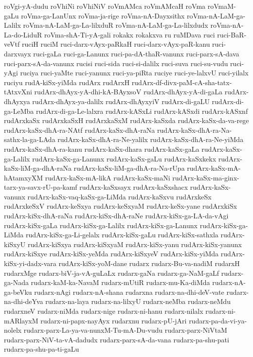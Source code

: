 {roVgi-yA-dudu
roVhiNi
roVhiNiV
roVmAMca
roVmAMcaH
roVma
roVmaM-gaLu
roVma-ga-LanUnx
roVma-ja-rige
roVma-nA-Dayxsithx
roVma-nA-LaM-ga-Lalilx
roVma-nA-LaM-ga-La-lilxduR
roVma-nA-LaM-ga-La-lilxdudx
roVma-nA-La-do-LiduR
roVma-shA-Ti-yA-gali
rokakx
rokakxva
ru
ruMDava
ruci
ruci-BaR-veVtf
ruciH
ruciM
ruci-darx-vAyx-paRkaH
ruci-darx-vAyx-paR-kanu
ruci-darxvayx
ruci-gaLa
ruci-ga-Lanunx
ruci-pa-dA-thaR-vanunx
ruci-parx-sA-dava
ruci-parx-sA-da-vanunx
rucisi
ruci-sida
ruci-si-dalilx
ruci-suva
ruci-su-vudu
ruci-yAgi
ruciya
ruci-yaMte
ruci-yanunx
ruci-ya-piRta
ruciye
ruci-ye-lalxvU
ruci-yilalx
ruciyu
rudA-kiSx-yiMda
rudArx
rudArxH
rudArx-df-divx-paM-cA-sha-tatx-tAtxvXni
rudArx-dhAyx-yA-dhi-kA-BAyxsoV
rudArx-dhAyx-yA-di-gaLa
rudArx-dhAyxya
rudArx-dhAyx-ya-dalilx
rudArx-dhAyxyiV
rudArx-di-gaLU
rudArx-di-ga-LeMba
rudArx-di-ga-Le-lalxra
rudArx-kASxLi
rudArx-kASxdi
rudArx-kASxnf
rudArxkaSx
rudArxkaSxH
rudArxkaSxM
rudArx-kaSxda
rudArx-kaSx-da-va-rege
rudArx-kaSx-dhA-ra-NAtf
rudArx-kaSx-dhA-raNa
rudArx-kaSx-dhA-ra-Na-sathx-la-ga-LAda
rudArx-kaSx-dhA-ra-Ne-yalilx
rudArx-kaSx-dhA-ra-Ne-yiMda
rudArx-kaSx-dhA-ra-kanu
rudArx-kaSx-dhara
rudArx-kaSx-gaLa
rudArx-kaSx-ga-Lalilx
rudArx-kaSx-ga-Lanunx
rudArx-kaSx-gaLu
rudArx-kaSxkekx
rudArx-kaSx-liM-ga-dhA-raNa
rudArx-kaSx-liM-ga-dhA-ra-Na-rUpa
rudArx-kaSx-mA-hAtamxyXM
rudArx-kaSx-mA-likA
rudArx-kaSx-maNi
rudArx-kaSx-ma-ginx-tarx-ya-savx-rU-pa-kamf
rudArx-kaSxsayx
rudArx-kaSxshacx
rudArx-kaSx-vanunx
rudArx-kaSx-vaq-kaSx-ga-LiMda
rudArx-kaSxvu
rudArxkeSx
rudArxkeSxV
rudArx-keSxya
rudArx-keSxyaM
rudArx-keSx-yane
rudArxkiSx
rudArx-kiSx-dhA-raNa
rudArx-kiSx-dhA-raNe
rudArx-kiSx-ga-LA-da-vAgi
rudArx-kiSx-gaLa
rudArx-kiSx-ga-Lalilx
rudArx-kiSx-ga-Lanunx
rudArx-kiSx-ga-LiMda
rudArx-kiSx-ga-Li-gelalx
rudArx-kiSx-gaLu
rudArx-kiSx-sathxla
rudArx-kiSxyU
rudArx-kiSxya
rudArx-kiSxyaM
rudArx-kiSx-yanu
rudArx-kiSx-yanunx
rudArx-kiSxye
rudArx-kiSx-yeMda
rudArx-kiSxyeV
rudArx-kiSx-yiMda
rudArx-kiSx-yi-dadx-vara
rudArx-kiSx-yoM-dane
rudarx
rudarx-Bu-va-nadiM
rudarxH
rudarxMge
rudarx-biV-ja-vA-guLaLx
rudarx-gaNa
rudarx-ga-NaM-gaLf
rudarx-ga-Nada
rudarx-kaM-ka-NavaM
rudarx-mUtiR
rudarx-mu-Ka-diMda
rudarx-nA-ga-beVku
rudarx-nAgi
rudarx-nA-shana
rudarxna
rudarx-na-dhi-deV-vate
rudarx-na-dhi-deYva
rudarx-na-laya
rudarx-na-lilxyU
rudarx-neMba
rudarx-neMdu
rudarxneV
rudarx-niMda
rudarx-nige
rudarx-ni-hanu
rudarx-nilalx
rudarx-ni-mARlayxM
rudarx-ni-papx-nayAyx
rudarxnu
rudarx-pU-jAri
rudarx-pa-da-vi-ya-nolelx
rudarx-parx-La-ya-va-nunxM-Tu-mA-Du-vudu
rudarx-parx-NiVtaM
rudarx-parx-NiV-ta-vA-dadudx
rudarx-parx-sA-da-vana
rudarx-pa-shu-pati
rudarx-pa-shu-pa-ti-gaLu
}
